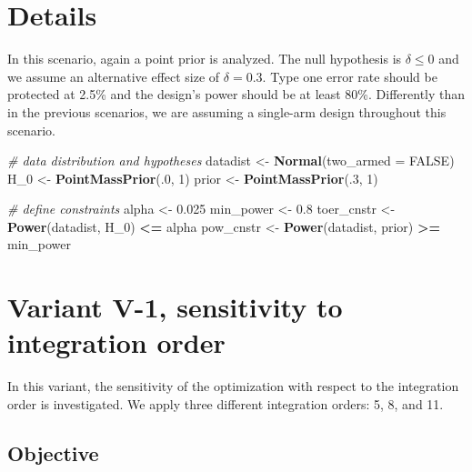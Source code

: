\documentclass[
]{book}
\newenvironment{Shaded}{\begin{snugshade}}{\end{snugshade}}
\newcommand{\CommentTok}[1]{\textcolor[rgb]{0.56,0.35,0.01}{\textit{#1}}}
\newcommand{\DataTypeTok}[1]{\textcolor[rgb]{0.13,0.29,0.53}{#1}}
\newcommand{\DecValTok}[1]{\textcolor[rgb]{0.00,0.00,0.81}{#1}}
\newcommand{\FloatTok}[1]{\textcolor[rgb]{0.00,0.00,0.81}{#1}}
\newcommand{\KeywordTok}[1]{\textcolor[rgb]{0.13,0.29,0.53}{\textbf{#1}}}
\newcommand{\NormalTok}[1]{#1}
\newcommand{\OperatorTok}[1]{\textcolor[rgb]{0.81,0.36,0.00}{\textbf{#1}}}
\newcommand{\OtherTok}[1]{\textcolor[rgb]{0.56,0.35,0.01}{#1}}
\newcommand{\StringTok}[1]{\textcolor[rgb]{0.31,0.60,0.02}{#1}}
\begin{document}
\hypertarget{details-4}{%
\section{Details}\label{details-4}}

In this scenario, again a point prior is analyzed.
The null hypothesis is \(\delta \leq 0\) and we assume an alternative effect size
of \(\delta = 0.3\).
Type one error rate should be protected at 2.5\% and the design's power should
be at least 80\%.
Differently than in the previous scenarios, we are assuming a single-arm
design throughout this scenario.

\begin{Shaded}
\begin{Highlighting}[]
\CommentTok{\# data distribution and hypotheses}
\NormalTok{datadist   \textless{}{-}}\StringTok{ }\KeywordTok{Normal}\NormalTok{(}\DataTypeTok{two\_armed =} \OtherTok{FALSE}\NormalTok{)}
\NormalTok{H\_}\DecValTok{0}\NormalTok{        \textless{}{-}}\StringTok{ }\KeywordTok{PointMassPrior}\NormalTok{(.}\DecValTok{0}\NormalTok{, }\DecValTok{1}\NormalTok{)}
\NormalTok{prior      \textless{}{-}}\StringTok{ }\KeywordTok{PointMassPrior}\NormalTok{(.}\DecValTok{3}\NormalTok{, }\DecValTok{1}\NormalTok{)}

\CommentTok{\# define constraints}
\NormalTok{alpha      \textless{}{-}}\StringTok{ }\FloatTok{0.025}
\NormalTok{min\_power  \textless{}{-}}\StringTok{ }\FloatTok{0.8}
\NormalTok{toer\_cnstr \textless{}{-}}\StringTok{ }\KeywordTok{Power}\NormalTok{(datadist, H\_}\DecValTok{0}\NormalTok{)   }\OperatorTok{\textless{}=}\StringTok{ }\NormalTok{alpha}
\NormalTok{pow\_cnstr  \textless{}{-}}\StringTok{ }\KeywordTok{Power}\NormalTok{(datadist, prior) }\OperatorTok{\textgreater{}=}\StringTok{ }\NormalTok{min\_power}
\end{Highlighting}
\end{Shaded}

\hypertarget{variantV_1}{%
\section{Variant V-1, sensitivity to integration order}\label{variantV_1}}

In this variant, the sensitivity of the optimization with respect to the
integration order is investigated.
We apply three different integration orders: 5, 8, and 11.

\hypertarget{objective-10}{%
\subsection{Objective}\label{objective-10}}
\end{document}
